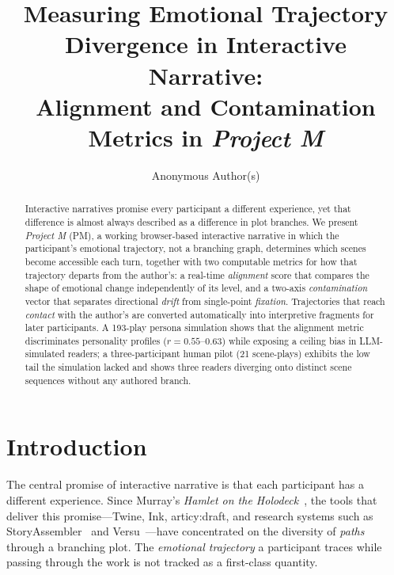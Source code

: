 \documentclass[runningheads]{llncs}
\newcommand{\sys}{Project M}
\newcommand{\sysshort}{PM}
\begin{document}
\title{Measuring Emotional Trajectory Divergence in Interactive Narrative:\\ Alignment and Contamination Metrics in \emph{\sys}}

\author{Anonymous Author(s)}

\maketitle

\begin{abstract}
Interactive narratives promise every participant a different experience, yet that difference is almost always described as a difference in plot branches. We present \emph{\sys} (\sysshort), a working browser-based interactive narrative in which the participant's emotional trajectory, not a branching graph, determines which scenes become accessible each turn, together with two computable metrics for how that trajectory departs from the author's: a real-time \emph{alignment} score that compares the shape of emotional change independently of its level, and a two-axis \emph{contamination} vector that separates directional \emph{drift} from single-point \emph{fixation}. Trajectories that reach \emph{contact} with the author's are converted automatically into interpretive fragments for later participants. A 193-play persona simulation shows that the alignment metric discriminates personality profiles ($r = 0.55$--$0.63$) while exposing a ceiling bias in LLM-simulated readers; a three-participant human pilot (21 scene-plays) exhibits the low tail the simulation lacked and shows three readers diverging onto distinct scene sequences without any authored branch.

\end{abstract}

\section{Introduction}

The central promise of interactive narrative is that each participant has a different experience. Since Murray's \emph{Hamlet on the Holodeck}~\cite{murray1997}, the tools that deliver this promise---Twine, Ink, articy:draft, and research systems such as StoryAssembler~\cite{garbe2019} and Versu~\cite{evans2014}---have concentrated on the diversity of \emph{paths} through a branching plot. The \emph{emotional trajectory} a participant traces while passing through the work is not tracked as a first-class quantity.
\end{document}
